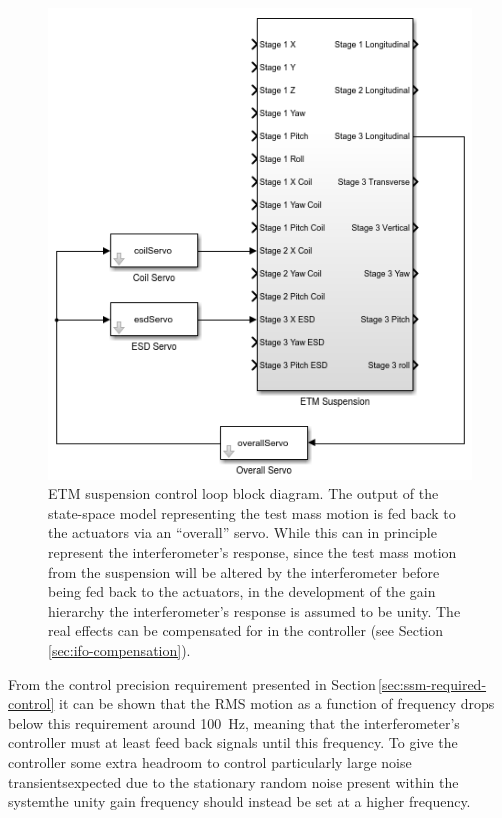 \begin{figure}
  \centering
  \includegraphics[width=0.7\columnwidth]{graphics/50-simulink-etm-control-loop.png}
  \caption[End test mass suspension control loop block diagram]{\label{fig:simulink-etm-control-loop}ETM suspension control loop block diagram. The output of the state-space model representing the test mass motion is fed back to the actuators via an ``overall'' servo. While this can in principle represent the interferometer's response, since the test mass motion from the suspension will be altered by the interferometer before being fed back to the actuators, in the development of the gain hierarchy the interferometer's response is assumed to be unity. The real effects can be compensated for in the controller (see Section\,\ref{sec:ifo-compensation}). }
\end{figure}

From the control precision requirement presented in Section\,\ref{sec:ssm-required-control} it can be shown that the \gls{RMS} motion as a function of frequency drops below this requirement around \SI{100}{\hertz}, meaning that the interferometer's controller must at least feed back signals until this frequency. To give the controller some extra headroom to control particularly large noise transients\textemdash expected due to the stationary random noise present within the system\textemdash the unity gain frequency should instead be set at a higher frequency.


